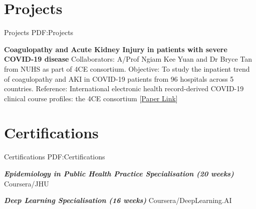 \documentclass[letterpaper,10pt,oneside]{article}
\begin{document}
\begin{body}
\section
{Projects}
{Projects}
{PDF:Projects}

\textbf{Coagulopathy and Acute Kidney Injury in patients with severe COVID-19 disease}
\BulletItem Collaborators: A/Prof Ngiam Kee Yuan and Dr Bryce Tan from NUHS as part of 4CE consortium.
\BulletItem Objective: To study the inpatient trend of coagulopathy and AKI in COVID-19 patients from 96 hospitals across 5 countries.
\BulletItem Reference: International electronic health record-derived COVID-19 clinical course profiles: the 4CE consortium [\href{https://www.nature.com/articles/s41746-020-00308-0}{Paper Link}]
\GapNoBreak





\section
{Certifications}
{Certifications}
{PDF:Certifications}

\textbf{\textit{Epidemiology in Public Health Practice Specialisation (20 weeks)}} Coursera/JHU 
\hfill
{}

\textbf{\textit{Deep Learning Specialisation (16 weeks)}} Coursera/DeepLearning.AI 
\hfill
{}


\end{body}
\end{document}
